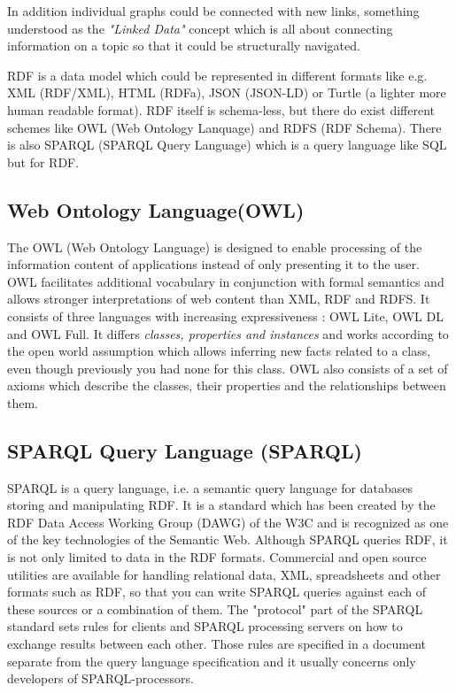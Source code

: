 In addition individual graphs could be connected with new links, something understood as the \textit{"Linked Data"} concept which is all about connecting information on a topic so that it could be structurally navigated.

RDF is a data model which could be represented in different formats like e.g. XML (RDF/XML), HTML (RDFa), JSON (JSON-LD) or Turtle (a lighter more human readable format). RDF itself is schema-less, but there do exist different schemes like OWL (Web Ontology Lanquage) and RDFS (RDF Schema). There is also SPARQL (SPARQL Query Language) which is a query language like SQL but for RDF.

\subsection{Web Ontology Language(OWL)}
The OWL (Web Ontology Language) is designed to enable processing of the information content of applications instead of only presenting it to the user. OWL facilitates additional vocabulary in conjunction with formal semantics and allows stronger interpretations of web content than XML, RDF and RDFS. It consists of three languages with increasing expressiveness : OWL Lite, OWL DL and OWL Full. It differs \textit{classes, properties and instances} and works according to the open world assumption which allows  inferring new facts related to a class, even though previously you had none for this class. OWL also consists of a set of axioms which describe the classes, their properties and the relationships between them.

\subsection{SPARQL Query Language (SPARQL)}
SPARQL is a query language, i.e. a semantic query language for databases storing and manipulating RDF. It is a standard which has been created by the RDF Data Access Working Group (DAWG) of the W3C and is recognized as one of the key technologies of the Semantic Web. Although SPARQL queries RDF, it is not only limited to data in the RDF formats. Commercial and open source utilities are available for handling relational data, XML, spreadsheets and other formats such as RDF, so that you can write SPARQL queries against each of these sources or a combination of them. The "protocol" part of the SPARQL standard sets rules for clients and SPARQL processing servers on how to exchange results between each other. Those rules are specified in a document separate from the query language specification and it usually concerns only developers of SPARQL-processors.

